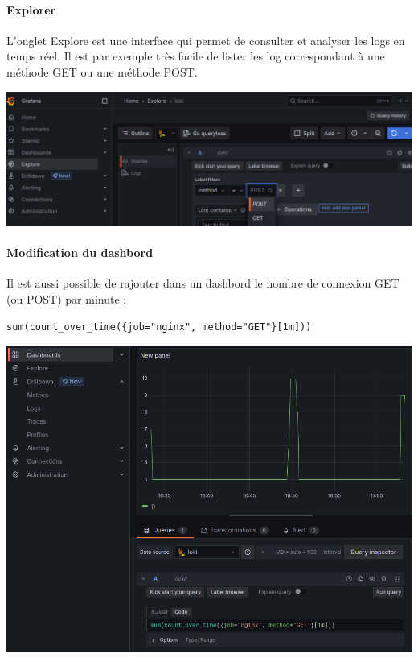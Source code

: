 \documentclass[french, 12pt]{article}%
\begin{document}
\paragraph{Explorer}


L'onglet Explore est une interface qui permet de consulter et analyser les logs en temps réel. Il est par exemple très facile de lister les log correspondant à une méthode GET ou une méthode POST. 
\begin{center}
\includegraphics[scale=0.5]{./ressource/grafanaExplore}
\end{center}


\paragraph{Modification du dashbord}
Il est aussi possible de rajouter dans un dashbord le nombre de connexion GET (ou POST) par minute : 
\begin{lstlisting}[style=commande]
sum(count_over_time({job="nginx", method="GET"}[1m]))
\end{lstlisting}

\begin{center}
\includegraphics[scale=0.5]{./ressource/grafanaNombre_delelement.png}
\end{center}
\end{document}
